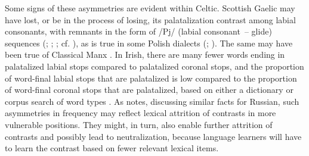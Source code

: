 \documentclass[output=paper,colorlinks,citecolor=brown]{langscibook}
\begin{document}
Some signs of these asymmetries are evident within Celtic. Scottish Gaelic may have lost, or be in the process of losing, its palatalization contrast among labial consonants, with remnants in the form of /Pj/ (labial consonant~-- glide) sequences (\cite{Jackson1967_Gaelic_pal_lab}; \cite{deBurca1977_syllabicity_pal}; \cite{ternes:2006}; cf. \cite{Nance_OMaolalaigh2021_Sottish_Gaelic_JIPA}), as is true in some Polish dialects (\cite{Czaplicki2010_Polish_pal_labial}; \cite{Iskarous_Kavitskaya2018_Slavic_palatalization}). The same may have been true of Classical Manx \citep{Lewin:2019}. In Irish, there are many fewer words ending in palatalized labial stops compared to palatalized coronal stops, and the proportion of word\hyp final labial stops that are palatalized is low compared to the proportion of word\hyp final coronal stops that are palatalized, based on either a dictionary or corpus search of word types \citep{NiChiosain_Padgett2012_Irish_pal_acous_percep}. As \citet{Kochetov2002_diss} notes, discussing similar facts for Russian, such asymmetries in frequency may reflect lexical attrition of contrasts in more vulnerable positions. They might, in turn, also enable further attrition of contrasts and possibly lead to neutralization, because language learners will have to learn the contrast based on fewer relevant lexical items.
\end{document}
